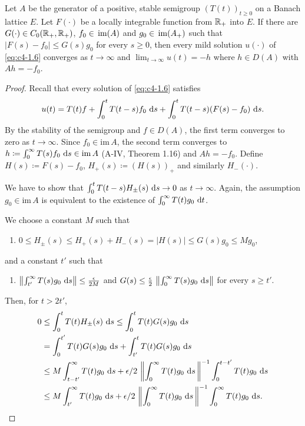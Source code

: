 \begin{proposition}\label{prop:c4-1.11}
%
%
%
Let $A$ be the generator of a positive, stable semigroup $(T(t))_{t \geq 0}$ on a Banach lattice $E$.
Let $F(\cdot)$ be a locally integrable function from $\mathbb{R}_{+}$ into $E$.
If there are $G(\cdot) \in C_{0}(\mathbb{R}_{+},\mathbb{R}_{+})$, $f_{0} \in  \mathop{}\mathrm{im}(A)$ and $g_{0} \in \mathop{}\mathrm{im}(A_{+})$ such that $|F(s) - f_{0}| \leq G(s)g_{0}$ for every $s \geq 0$, then every mild solution $u(\cdot)$ of \eqref{eq:c4-1.6} converges as $t \to \infty$ and $\lim_{t \to \infty} u(t) = -h$ where $h \in D(A)$ with $Ah = -f_{0}$.
\end{proposition}
\begin{proof}
Recall that every solution of \ref{eq:c4-1.6} satisfies
\begin{equation}\label{eq:c4-1.7}
u(t) = T(t)f + \int_{0}^{t} T(t-s)f_{0} \, \mathop{}\!\mathrm{d}{s} + \int_{0}^{t} T(t-s)(F(s) - f_{0}) \, \mathop{}\!\mathrm{d}{s}.
\end{equation}
By the stability of the semigroup and $f \in D(A)$, the first term converges to zero as $t \to \infty$.
Since $f_{0} \in \text{im} \, A$, the second term converges to $h \coloneqq  \int_{0}^{\infty} T(s)f_{0} \, \mathop{}\!\mathrm{d}{s} \in \text{im} \, A$ (A-IV, Theorem 1.16) and $Ah = -f_{0}$.
Define $H(s) \coloneqq F(s) - f_{0}$, 
$ H_{+}(s) \coloneqq (H(s))_{+} $ 
and similarly $H_{-}(\cdot)$.

We have to show that $\int_{0}^{t} T(t-s)H_{\pm}(s) \, \mathop{}\!\mathrm{d}{s} \to 0$ as $t \to \infty$.
Again, the assumption $g_{0} \in \text{im}\, A$ is equivalent to the existence of $\int_{0}^{\infty} T(t)g_{0} \, \mathop{}\!\mathrm{d}{t}$.

We choose a constant $M$  such that 
\begin{enumerate}[\upshape (i)]
    \item 
    $0 \leq H_{\pm}(s) \leq H_{+}(s) + H_{-}(s) = |H(s)| \leq G(s)g_{0} \leq Mg_{0}$,
\end{enumerate}
and a constant $t'$ such that
\begin{enumerate}
    \item $ \left\|\int_{t'}^{\infty} T(s)g_{0} \, \mathop{}\!\mathrm{d}{s}\right\| \leq \frac{\epsilon}{2M}$ and  
$G(s) \leq \frac{\epsilon}{2} \,  \left\|\int_{0}^{\infty} T(s)g_{0} \, \mathop{}\!\mathrm{d}{s}\right\|$ for every $s \geq t'$.
\end{enumerate}
Then, for $t > 2t'$,
\begin{align*}
0 &\leq \int_{0}^{t} T(t)H_{\pm}(s) \, \ds \leq \int_{0}^{t} T(t)G(s)g_{0} \, \ds\\
&= \int_{0}^{t'} T(t)G(s)g_{0} \, \ds + \int_{t'}^{t} T(t)G(s)g_{0} \, \ds\\
&\leq M \int_{t-t'}^{\infty} T(t)g_{0} \, \ds + \epsilon/2 \,  \left\|\int_{0}^{\infty} T(t)g_{0} \, \ds\, \right\|^{-1} \int_{0}^{t-t'} T(t)g_{0} \, \ds\\
&\leq M \int_{t'}^{\infty} T(t)g_{0} \, \ds + \epsilon/2 \,  \left\|\int_{0}^{\infty} T(t)g_{0} \, \ds\, \right\|^{-1} \int_{0}^{\infty} T(t)g_{0} \, \ds.
\end{align*}


\end{proof}
